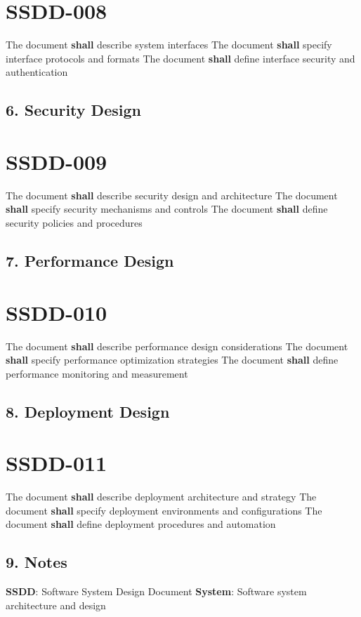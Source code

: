 \section{SSDD-008}\label{SSDD-008}

The document \textbf{shall} describe system interfaces
The document \textbf{shall} specify interface protocols and formats
The document \textbf{shall} define interface security and authentication

\subsection{6. Security Design}

\section{SSDD-009}\label{SSDD-009}

The document \textbf{shall} describe security design and architecture
The document \textbf{shall} specify security mechanisms and controls
The document \textbf{shall} define security policies and procedures

\subsection{7. Performance Design}

\section{SSDD-010}\label{SSDD-010}

The document \textbf{shall} describe performance design considerations
The document \textbf{shall} specify performance optimization strategies
The document \textbf{shall} define performance monitoring and measurement

\subsection{8. Deployment Design}

\section{SSDD-011}\label{SSDD-011}

The document \textbf{shall} describe deployment architecture and strategy
The document \textbf{shall} specify deployment environments and configurations
The document \textbf{shall} define deployment procedures and automation

\subsection{9. Notes}
\textbf{SSDD}: Software System Design Document
\textbf{System}: Software system architecture and design

